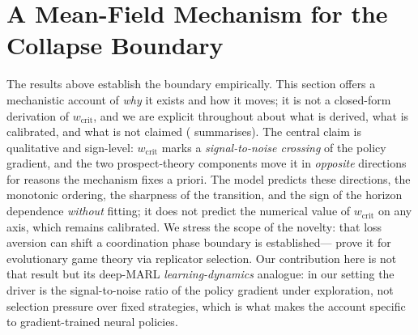\documentclass[letterpaper]{article}
\theoremstyle{plain}
\newcommand{\wcrit}{w_{\mathrm{crit}}}
\begin{document}
\section{A Mean-Field Mechanism for the Collapse Boundary}
\label{sec:meanfield}

The results above establish the boundary empirically. This section offers a
mechanistic account of \emph{why} it exists and how it moves; it is not a
closed-form derivation of $\wcrit$, and we are explicit throughout about
what is derived, what is calibrated, and what is not claimed
( summarises). The central claim is qualitative and
sign-level: $\wcrit$ marks a \emph{signal-to-noise crossing} of the policy
gradient, and the two prospect-theory components move it in \emph{opposite}
directions for reasons the mechanism fixes a priori. The model predicts
these directions, the monotonic ordering, the sharpness of the transition,
and the sign of the horizon dependence \emph{without} fitting; it does not
predict the numerical value of $\wcrit$ on any axis, which remains
calibrated. We stress the scope of the novelty: that loss aversion can
shift a coordination phase boundary is established---\citet{mengesha2025}
prove it for evolutionary game theory via replicator selection. Our
contribution here is not that result but its deep-MARL \emph{learning-dynamics}
analogue: in our setting the driver is the signal-to-noise ratio of the
policy gradient under exploration, not selection pressure over fixed
strategies, which is what makes the account specific to gradient-trained
neural policies.
\end{document}
